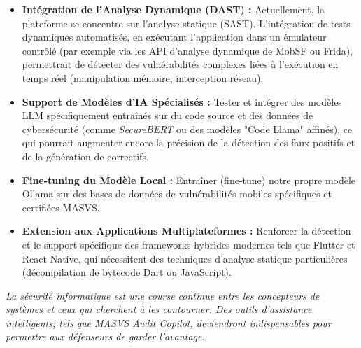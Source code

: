 \begin{itemize}[label=\textcolor{PrimaryBlue}{\faRocket}]
    \item \textbf{Intégration de l'Analyse Dynamique (DAST) :} Actuellement, la plateforme se concentre sur l'analyse statique (SAST). L'intégration de tests dynamiques automatisés, en exécutant l'application dans un émulateur contrôlé (par exemple via les API d'analyse dynamique de MobSF ou Frida), permettrait de détecter des vulnérabilités complexes liées à l'exécution en temps réel (manipulation mémoire, interception réseau).
    \item \textbf{Support de Modèles d'IA Spécialisés :} Tester et intégrer des modèles LLM spécifiquement entraînés sur du code source et des données de cybersécurité (comme \textit{SecureBERT} ou des modèles "Code Llama" affinés), ce qui pourrait augmenter encore la précision de la détection des faux positifs et de la génération de correctifs.
    \item \textbf{Fine-tuning du Modèle Local :} Entraîner (fine-tune) notre propre modèle Ollama sur des bases de données de vulnérabilités mobiles spécifiques et certifiées MASVS.
    \item \textbf{Extension aux Applications Multiplateformes :} Renforcer la détection et le support spécifique des frameworks hybrides modernes tels que Flutter et React Native, qui nécessitent des techniques d'analyse statique particulières (décompilation de bytecode Dart ou JavaScript).
\end{itemize}

\vspace{1cm}
\begin{center}
  \textit{La sécurité informatique est une course continue entre les concepteurs de systèmes et ceux qui cherchent à les contourner. Des outils d'assistance intelligents, tels que MASVS Audit Copilot, deviendront indispensables pour permettre aux défenseurs de garder l'avantage.}
\end{center}

\cleardoublepage
